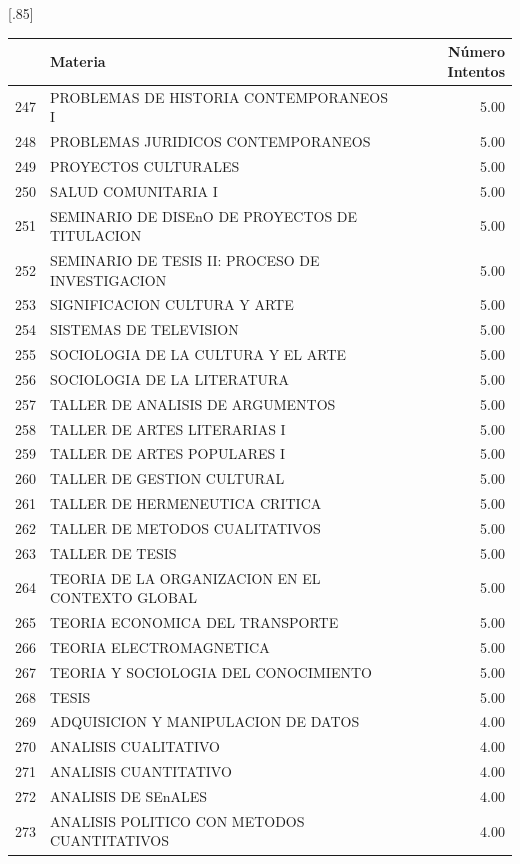 \documentclass[12pt]{article}
\begin{document}
\begin{table}[ht]
\centering
\scalebox{0.75}[.85]{
\begin{tabular}{rlr}
  \hline
 & Materia & N\'umero Intentos\\   
  \hline
  247 & PROBLEMAS DE HISTORIA CONTEMPORANEOS I & 5.00 \\ 
  248 & PROBLEMAS JURIDICOS CONTEMPORANEOS & 5.00 \\ 
  249 & PROYECTOS CULTURALES & 5.00 \\ 
  250 & SALUD COMUNITARIA I & 5.00 \\ 
  251 & SEMINARIO DE DISEnO DE PROYECTOS DE TITULACION & 5.00 \\ 
  252 & SEMINARIO DE TESIS II: PROCESO DE INVESTIGACION & 5.00 \\ 
  253 & SIGNIFICACION CULTURA Y ARTE & 5.00 \\ 
  254 & SISTEMAS DE TELEVISION & 5.00 \\ 
  255 & SOCIOLOGIA DE LA CULTURA Y EL ARTE & 5.00 \\ 
  256 & SOCIOLOGIA DE LA LITERATURA & 5.00 \\ 
  257 & TALLER DE ANALISIS DE ARGUMENTOS & 5.00 \\ 
  258 & TALLER DE ARTES LITERARIAS I & 5.00 \\ 
  259 & TALLER DE ARTES POPULARES I & 5.00 \\ 
  260 & TALLER DE GESTION CULTURAL & 5.00 \\ 
  261 & TALLER DE HERMENEUTICA CRITICA & 5.00 \\ 
  262 & TALLER DE METODOS CUALITATIVOS & 5.00 \\ 
  263 & TALLER DE TESIS & 5.00 \\ 
  264 & TEORIA DE LA ORGANIZACION EN EL CONTEXTO GLOBAL & 5.00 \\ 
  265 & TEORIA ECONOMICA DEL TRANSPORTE & 5.00 \\ 
  266 & TEORIA ELECTROMAGNETICA & 5.00 \\ 
  267 & TEORIA Y SOCIOLOGIA DEL CONOCIMIENTO & 5.00 \\ 
  268 & TESIS & 5.00 \\ 
  269 & ADQUISICION Y MANIPULACION DE DATOS & 4.00 \\ 
  270 & ANALISIS CUALITATIVO & 4.00 \\ 
  271 & ANALISIS CUANTITATIVO & 4.00 \\ 
  272 & ANALISIS DE SEnALES & 4.00 \\ 
  273 & ANALISIS POLITICO CON METODOS CUANTITATIVOS & 4.00 \\ 

\end{tabular}}
\end{table}
\end{document}
